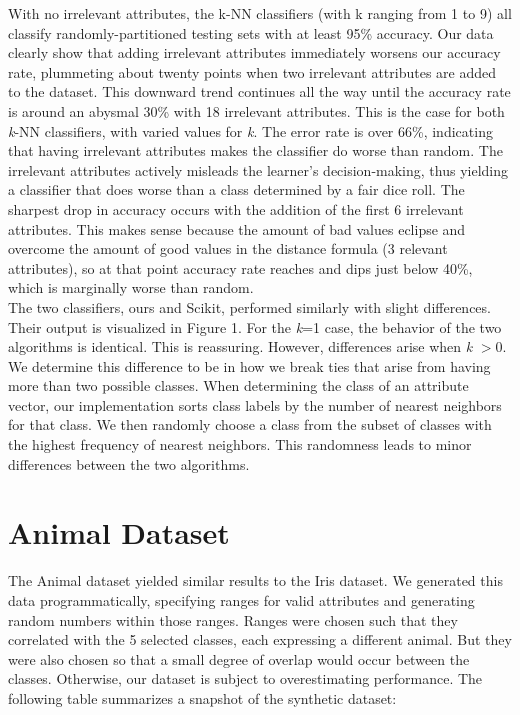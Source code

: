 \documentclass{article}
\begin{document}
With no irrelevant attributes, the k-NN classifiers (with k ranging from 1 to 9) all classify randomly-partitioned testing sets with at least 95\% accuracy. Our data clearly show that adding irrelevant attributes immediately worsens our accuracy rate, plummeting about twenty points when two irrelevant attributes are added to the dataset. This downward trend continues all the way until the accuracy rate is around an abysmal 30\% with 18 irrelevant attributes. This is the case for both \textit{k}-NN classifiers, with varied values for \textit{k}. The error rate is over 66\%, indicating that having irrelevant attributes makes the classifier do worse than random. The irrelevant attributes actively misleads the learner's decision-making, thus yielding a classifier that does worse than a class determined by a fair dice roll. The sharpest drop in accuracy occurs with the addition of the first 6 irrelevant attributes. This makes sense because the amount of bad values eclipse and overcome the amount of good values in the distance formula (3 relevant attributes), so at that point accuracy rate reaches and dips just below 40\%, which is marginally worse than random. \\

The two classifiers, ours and Scikit, performed similarly with slight differences. Their output is visualized in Figure 1. For the \textit{k}=1 case, the behavior of the two algorithms is  identical. This is reassuring. However, differences arise when \textit{k} $>0$. We determine this difference to be in how we break ties that arise from having more than two possible classes. When determining the class of an attribute vector, our implementation sorts class labels by the number of nearest neighbors for that class. We then randomly choose a class from the subset of classes with the highest frequency of nearest neighbors. This randomness leads to minor differences between the two algorithms. 

\pagebreak

\section{Animal Dataset}

The Animal dataset yielded similar results to the Iris dataset. We generated this data programmatically, specifying ranges for valid attributes and generating random numbers within those ranges. Ranges were chosen such that they correlated with the 5 selected classes, each expressing a different animal. But they were also chosen so that a small degree of overlap would occur between the classes. Otherwise, our dataset is subject to overestimating performance. The following table summarizes a snapshot of the synthetic dataset: 
\end{document}
